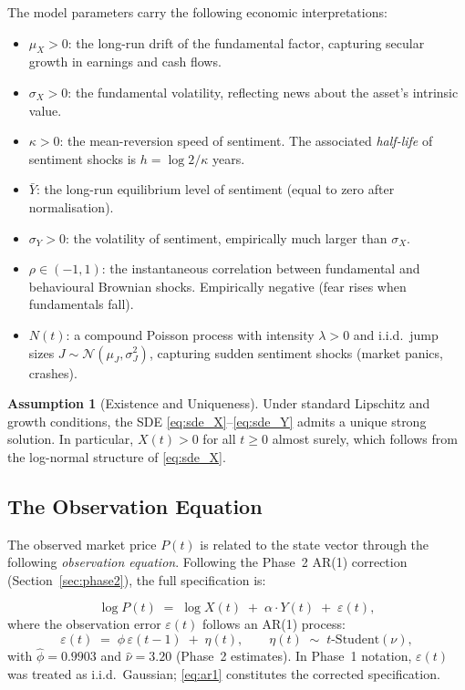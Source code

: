 \documentclass[12pt,a4paper]{article}
\theoremstyle{definition}
\newtheorem{assumption}[theorem]{Assumption}
\theoremstyle{remark}
\begin{document}
\noindent The model parameters carry the following economic
interpretations:

\begin{itemize}[leftmargin=2em]
  \item $\mu_X > 0$: the long-run drift of the fundamental factor,
        capturing secular growth in earnings and cash flows.
  \item $\sigma_X > 0$: the fundamental volatility, reflecting news
        about the asset's intrinsic value.
  \item $\kappa > 0$: the mean-reversion speed of sentiment. The
        associated \emph{half-life} of sentiment shocks is
        $h = \log 2 / \kappa$ years.
  \item $\bar{Y}$: the long-run equilibrium level of sentiment
        (equal to zero after normalisation).
  \item $\sigma_Y > 0$: the volatility of sentiment, empirically much
        larger than $\sigma_X$.
  \item $\rho \in (-1, 1)$: the instantaneous correlation between
        fundamental and behavioural Brownian shocks. Empirically
        negative (fear rises when fundamentals fall).
  \item $N(t)$: a compound Poisson process with intensity $\lambda > 0$
        and i.i.d.\ jump sizes $J \sim \mathcal{N}(\mu_J, \sigma_J^2)$,
        capturing sudden sentiment shocks (market panics, crashes).
\end{itemize}

\begin{assumption}[Existence and Uniqueness]
  Under standard Lipschitz and growth conditions, the SDE
  \eqref{eq:sde_X}--\eqref{eq:sde_Y} admits a unique strong solution.
  In particular, $X(t) > 0$ for all $t \geq 0$ almost surely, which
  follows from the log-normal structure of \eqref{eq:sde_X}.
\end{assumption}

\subsection{The Observation Equation}

The observed market price $P(t)$ is related to the state vector through
the following \emph{observation equation}. Following the Phase~2
AR(1) correction (Section~\ref{sec:phase2}), the full specification is:

\begin{equation}
  \boxed{\log P(t) \;=\; \log X(t) \;+\; \alpha \cdot Y(t)
  \;+\; \varepsilon(t),}
  \label{eq:obs}
\end{equation}
where the observation error $\varepsilon(t)$ follows an AR(1) process:
\begin{equation}
  \varepsilon(t) \;=\; \phi\,\varepsilon(t-1) \;+\; \eta(t),
  \qquad \eta(t) \;\sim\; t\text{-Student}(\nu),
  \label{eq:ar1}
\end{equation}
with $\hat{\phi} = 0.9903$ and $\hat{\nu} = 3.20$ (Phase~2 estimates).
In Phase~1 notation, $\varepsilon(t)$ was treated as i.i.d.\ Gaussian;
\eqref{eq:ar1} constitutes the corrected specification.
\end{document}

